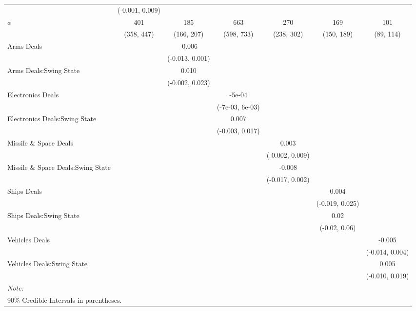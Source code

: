 \begin{table}[H]
{\begin{tabular}[t]{lcccccc}
 & (-0.001, 0.009) &  &  &  &  & \\
$\phi$ & 401 & 185 & 663 & 270 & 169 & 101\\
 & (358, 447) & (166, 207) & (598, 733) & (238, 302) & (150, 189) & (89, 114)\\
Arms Deals &  & -0.006 &  &  &  & \\
 &  & (-0.013, 0.001) &  &  &  & \\
Arms Deals:Swing State &  & 0.010 &  &  &  & \\
 &  & (-0.002, 0.023) &  &  &  & \\
Electronics Deals &  &  & -5e-04 &  &  & \\
 &  &  & (-7e-03, 6e-03) &  &  & \\
Electronics Deals:Swing State &  &  & 0.007 &  &  & \\
 &  &  & (-0.003, 0.017) &  &  & \\
Missile \& Space Deals &  &  &  & 0.003 &  & \\
 &  &  &  & (-0.002, 0.009) &  & \\
Missile \& Space Deals:Swing State &  &  &  & -0.008 &  & \\
 &  &  &  & (-0.017, 0.002) &  & \\
Ships Deals &  &  &  &  & 0.004 & \\
 &  &  &  &  & (-0.019, 0.025) & \\
Ships Deals:Swing State &  &  &  &  & 0.02 & \\
 &  &  &  &  & (-0.02, 0.06) & \\
Vehicles Deals &  &  &  &  &  & -0.005\\
 &  &  &  &  &  & (-0.014, 0.004)\\
Vehicles Deals:Swing State &  &  &  &  &  & 0.005\\
 &  &  &  &  &  & (-0.010, 0.019)\\
\bottomrule
\multicolumn{7}{l}{\rule{0pt}{1em}\textit{Note: }}\\
\multicolumn{7}{l}{\rule{0pt}{1em}90\% Credible Intervals in parentheses.}\\
\end{tabular}}
\end{table}
